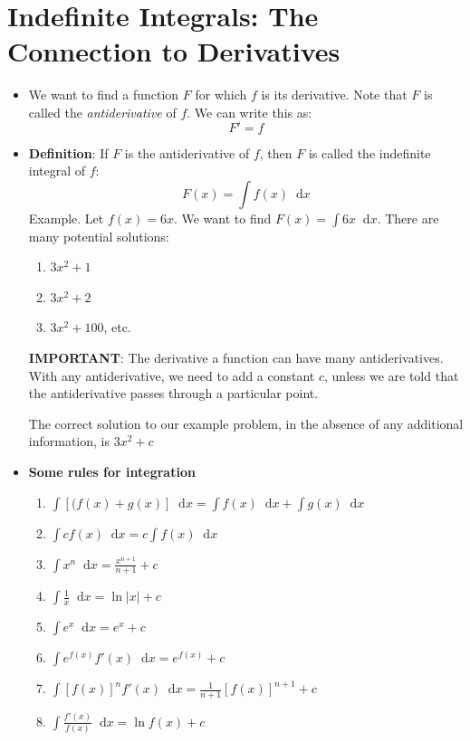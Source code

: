 \documentclass[11pt]{article}
\theoremstyle{definition}
\theoremstyle{remark}
\newcommand*\diff{\mathop{}\!\mathrm{d}}
\begin{document}
\section{Indefinite Integrals: The Connection to Derivatives}
\begin{itemize}
\item We want to find a function $F$ for which $f$ is its derivative. Note that $F$ is called the \textit{antiderivative} of $f$. We can write this as:
$$
F' = f
$$
\item \textbf{Definition}: If $F$ is the antiderivative of $f$, then $F$ is called the indefinite integral of $f$:
$$
F(x) = \int f(x) \diff x 
$$
Example. Let $f(x) = 6x$. We want to find $F(x) = \int 6x \diff x$. There are many potential solutions:
\begin{enumerate}
\item $3x^2 + 1$
\item $3x^2 + 2$
\item $3x^2 + 100$, etc. 
\end{enumerate}
\textbf{IMPORTANT}: The derivative a function can have many antiderivatives. With any antiderivative, we need to add a constant $c$, unless we are told that the antiderivative passes through a particular point. 

The correct solution to our example problem, in the absence of any additional information, is $3x^2 + c$

\item \textbf{Some rules for integration}
\begin{enumerate}
\item $\displaystyle
\int [(f(x) + g(x)] \diff x = \int f(x) \diff x + \int g(x) \diff x
$
\item $\displaystyle
\int c f(x) \diff x = c \int f(x) \diff x
$
\item $\displaystyle
\int x^n \diff x = \frac{x^{n+1}}{n+1} + c
$
\item $\displaystyle
\int \frac{1}{x} \diff x = \ln|x| + c
$ 
\item $\displaystyle
\int e^x \diff x = e^x + c
$
\item $\displaystyle
\int e^{f(x)} f'(x) \diff x = e^{f(x)}+c
$
\item $\displaystyle
\int [f(x)]^nf'(x) \diff x = \frac{1}{n+1}[f(x)]^{n+1}+c
$
\item $\displaystyle
\int \frac{f'(x)}{f(x)} \diff x = \ln f(x) + c
$
\end{enumerate}
\end{itemize}
\end{document}
